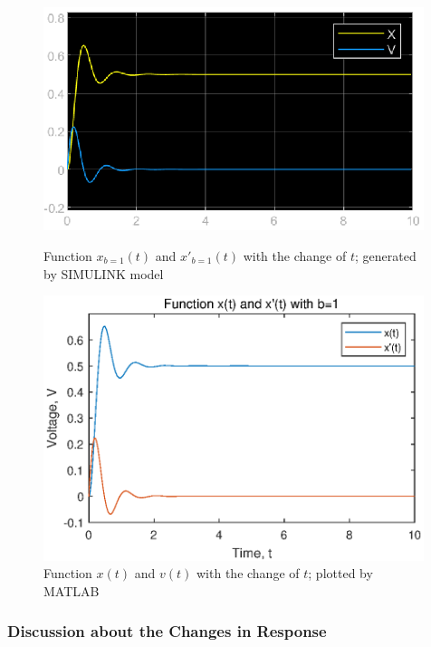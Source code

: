 \begin{figure}[htbp]
  \begin{minipage}{0.49\linewidth}
    \centering
    \includegraphics[width=0.99\textwidth]{pics/ex1-b1.eps}
    \caption{Function $x_{b=1}(t)$ and $x'_{b=1}(t)$ with the change of $t$;
    generated by SIMULINK model}
    \label{pic-b1}
  \end{minipage}
  \begin{minipage}{0.49\linewidth}
    \centering
    \includegraphics[width=0.99\textwidth]{pics/ex1-b1-plot.eps}
    \caption{Function $x(t)$ and $v(t)$ with the change of $t$; plotted by 
    MATLAB}
    \label{pic-b1-plot}
  \end{minipage}
  
\end{figure}

\subsubsection*{Discussion about the Changes in Response}

